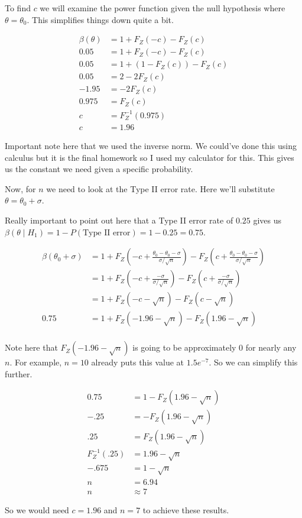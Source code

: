 To find $c$ we will examine the power function given the null hypothesis where $\theta = \theta_0$. This simplifies things down quite a bit.

\begin{align*}
	\beta(\theta) &= 1 + F_Z(-c) - F_Z(c) \\
	0.05 &= 1 + F_Z(-c) - F_Z(c) \\
	0.05 &= 1 + (1 - F_Z(c)) - F_Z(c) \\
	0.05 &= 2 - 2F_Z(c) \\
	-1.95 &= -2F_Z(c) \\
	0.975 &= F_Z(c) \\
	c &= F_Z^{-1}(0.975) \\
	c &= 1.96
\end{align*}

Important note here that we used the inverse norm. We could've done this using calculus but it is the final homework so I used my calculator for this. This gives us the constant we need given a specific probability. 

Now, for $n$ we need to look at the Type II error rate. Here we'll substitute $\theta = \theta_0 + \sigma$. 

Really important to point out here that a Type II error rate of $0.25$ gives us $\beta(\theta \mid H_1) = 1 - P(\text{Type II error}) = 1 - 0.25 = 0.75$.

\begin{align*}
	\beta(\theta_0 + \sigma) &= 1 + F_{Z}\left( -c + \frac{\theta_0 - \theta_0 - \sigma}{\sigma/\sqrt{n}} \right) - F_{Z}\left(  c + \frac{\theta_0 - \theta_0 - \sigma}{\sigma/\sqrt{n}} \right) \\
	&= 1 + F_{Z}\left( -c + \frac{-\sigma}{\sigma/\sqrt{n}} \right) - F_{Z}\left(  c + \frac{-\sigma}{\sigma/\sqrt{n}} \right) \\
	&= 1 + F_{Z}\left( -c - \sqrt{n} \right) - F_{Z}\left(  c - \sqrt{n} \right) \\
	0.75 &= 1 + F_{Z}\left( -1.96 - \sqrt{n} \right) - F_{Z}\left(  1.96 - \sqrt{n} \right) \\
\end{align*}

Note here that $F_Z(-1.96 - \sqrt{n})$ is going to be approximately $0$ for nearly any $n$. For example, $n=10$ already puts this value at $1.5e^{-7}$. So we can simplify this further.

\begin{align*}
	0.75 &=  1 - F_{Z}\left(  1.96 - \sqrt{n} \right) \\
	-.25 &= - F_{Z}\left(  1.96 - \sqrt{n} \right) \\
	.25 &=  F_{Z}\left(  1.96 - \sqrt{n} \right) \\
	F_Z^{-1}(.25) &= 1.96 - \sqrt{n} \\
	-.675 &= 1 - \sqrt{n} \\
	n &= 6.94 \\
	n &\approx 7
\end{align*}

So we would need $c = 1.96$ and $n=7$ to achieve these results.
